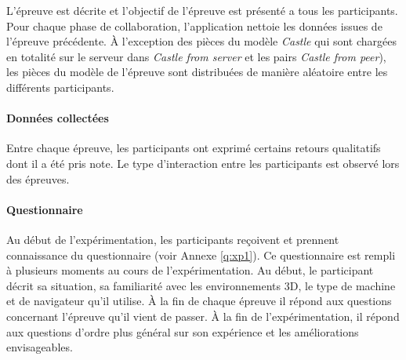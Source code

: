 L'épreuve est décrite et l'objectif de l'épreuve est présenté a tous les participants.
Pour chaque phase de collaboration, l'application nettoie les données issues de 
l'épreuve précédente. 
À l'exception des pièces du modèle \textit{Castle} qui sont chargées
en totalité sur le serveur dans \textit{Castle from server} et les pairs \textit{Castle 
from peer}), les pièces du modèle de l'épreuve sont distribuées de manière 
aléatoire entre les différents participants.

\paragraph{Données collectées}
Entre chaque épreuve, les 
participants ont exprimé certains retours qualitatifs dont il a été pris note. Le type 
d'interaction entre les participants est observé lors des épreuves.

\paragraph{Questionnaire}
Au début de l'expérimentation, les participants reçoivent et prennent connaissance 
du questionnaire (voir Annexe \ref{q:xp1}). Ce questionnaire est rempli à plusieurs 
moments au cours de l'expérimentation. Au début, le participant décrit sa situation, 
sa familiarité avec les environnements \gls{3D}, le type de machine et de 
navigateur 
qu'il utilise. À la fin de chaque épreuve il répond aux questions concernant 
l'épreuve qu'il vient de passer. À la fin de l'expérimentation, il répond aux 
questions d'ordre plus général sur son expérience et les améliorations 
envisageables.
